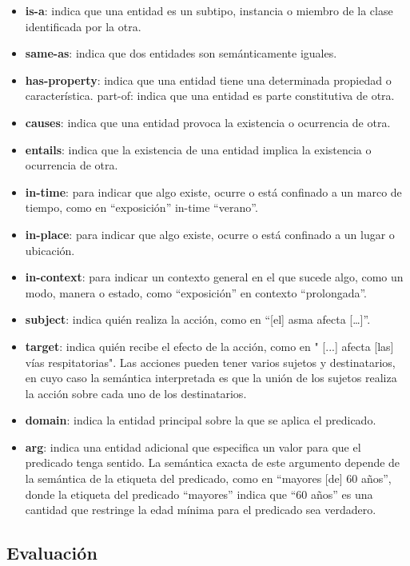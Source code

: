 \documentclass[10pt]{article} %
\begin{document}
	\begin{itemize}
		\item \textbf{is-a}: indica que una entidad es un subtipo, instancia o miembro de la clase identificada por la otra.
		\item \textbf{same-as}: indica que dos entidades son semánticamente iguales.
		\item \textbf{has-property}: indica que una entidad tiene una determinada propiedad o característica.
		part-of: indica que una entidad es parte constitutiva de otra.
		\item \textbf{causes}: indica que una entidad provoca la existencia o ocurrencia de otra.
		\item \textbf{entails}: indica que la existencia de una entidad implica la existencia o ocurrencia de otra.
		\item \textbf{in-time}: para indicar que algo existe, ocurre o está confinado a un marco de tiempo, como en “exposición” in-time “verano”.
		\item \textbf{in-place}: para indicar que algo existe, ocurre o está confinado a un lugar o ubicación.
		\item \textbf{in-context}: para indicar un contexto general en el que sucede algo, como un modo, manera o estado, como “exposición” en contexto “prolongada”.
		\item \textbf{subject}: indica quién realiza la acción, como en “[el] asma afecta […]”.
		\item \textbf{target}: indica quién recibe el efecto de la acción, como en " [...] afecta [las] v\'ias respitatorias". Las acciones pueden tener varios sujetos y destinatarios, en cuyo caso la semántica interpretada es que la unión de los sujetos realiza la acción sobre cada uno de los destinatarios.
		\item \textbf{domain}: indica la entidad principal sobre la que se aplica el predicado.
		\item \textbf{arg}: indica una entidad adicional que especifica un valor para que el predicado tenga sentido. La semántica exacta de este argumento depende de la semántica de la etiqueta del predicado, como en “mayores [de] 60 años”, donde la etiqueta del predicado “mayores” indica que “60 años” es una cantidad que restringe la edad mínima para el predicado sea verdadero.
		
	\end{itemize}
	
	\subsection*{Evaluaci\'on}\label{evaluacion}
	
\end{document}
